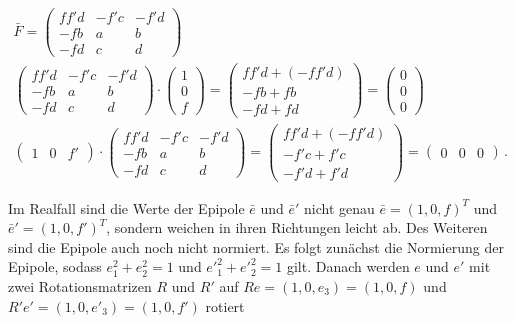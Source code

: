 \begin{gather}
	\bar{F} = \begin{pmatrix}
	ff'd&-f'c&-f'd\\
	-fb&a&b\\
	-fd&c&d\label{eq:FSampson}
	\end{pmatrix}\\
	\begin{pmatrix}
	ff'd&-f'c&-f'd\\
	-fb&a&b\\
	-fd&c&d
	\end{pmatrix} \cdot \begin{pmatrix}
	1\\0\\f
	\end{pmatrix} = 
	\begin{pmatrix}
	ff'd + (-ff'd)\\
	-fb + fb\\
	-fd +fd
	\end{pmatrix}
	= 
	\begin{pmatrix}
	0\\0\\0
	\end{pmatrix}\\
	\begin{pmatrix}
	1&0&f'
	\end{pmatrix} \cdot
	\begin{pmatrix}
	ff'd&-f'c&-f'd\\
	-fb&a&b\\
	-fd&c&d
	\end{pmatrix} =
	\begin{pmatrix}
	ff'd + (-ff'd)\\
	-f'c + f'c\\
	-f'd + f'd
	\end{pmatrix} = 
		\begin{pmatrix}
	0&0&0
	\end{pmatrix} \, .
\end{gather}

Im Realfall sind die Werte der Epipole $\bar{e}$ und $\bar{e}'$ nicht genau $\bar{e} = (1,0,f)^T$ und $\bar{e}' = (1,0,f')^T$, sondern weichen in ihren Richtungen leicht ab. Des Weiteren sind die Epipole auch noch nicht normiert. Es folgt zunächst die Normierung der Epipole, sodass $e^2_1 + e^2_2 = 1$ und $e'^2_1 + e'^2_2 = 1$ gilt. Danach werden $e$ und $e'$ mit zwei Rotationsmatrizen $R$ und $R'$ auf $Re = (1,0,e_3) = (1,0,f)$ und $R'e' = (1,0,e'_3)=(1,0,f')$ rotiert

